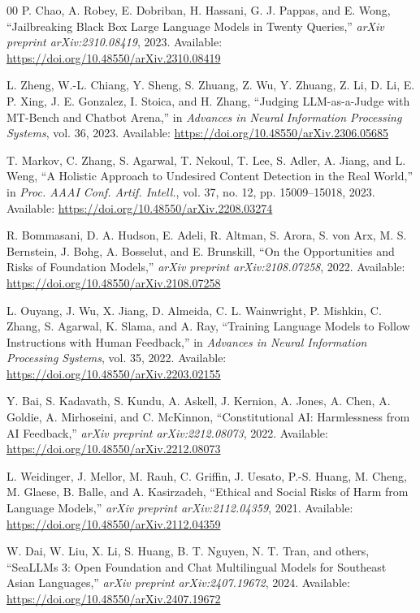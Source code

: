 \documentclass[conference]{IEEEtran}
\begin{document}
\begin{thebibliography}{00}
 P. Chao, A. Robey, E. Dobriban, H. Hassani, G. J. Pappas, and E. Wong, ``Jailbreaking Black Box Large Language Models in Twenty Queries,'' \textit{arXiv preprint arXiv:2310.08419}, 2023. Available: \url{https://doi.org/10.48550/arXiv.2310.08419}

 L. Zheng, W.-L. Chiang, Y. Sheng, S. Zhuang, Z. Wu, Y. Zhuang, Z. Li, D. Li, E. P. Xing, J. E. Gonzalez, I. Stoica, and H. Zhang, ``Judging LLM-as-a-Judge with MT-Bench and Chatbot Arena,'' in \textit{Advances in Neural Information Processing Systems}, vol. 36, 2023. Available: \url{https://doi.org/10.48550/arXiv.2306.05685}

 T. Markov, C. Zhang, S. Agarwal, T. Nekoul, T. Lee, S. Adler, A. Jiang, and L. Weng, ``A Holistic Approach to Undesired Content Detection in the Real World,'' in \textit{Proc. AAAI Conf. Artif. Intell.}, vol. 37, no. 12, pp. 15009--15018, 2023. Available: \url{https://doi.org/10.48550/arXiv.2208.03274}

 R. Bommasani, D. A. Hudson, E. Adeli, R. Altman, S. Arora, S. von Arx, M. S. Bernstein, J. Bohg, A. Bosselut, and E. Brunskill, ``On the Opportunities and Risks of Foundation Models,'' \textit{arXiv preprint arXiv:2108.07258}, 2022. Available: \url{https://doi.org/10.48550/arXiv.2108.07258}

 L. Ouyang, J. Wu, X. Jiang, D. Almeida, C. L. Wainwright, P. Mishkin, C. Zhang, S. Agarwal, K. Slama, and A. Ray, ``Training Language Models to Follow Instructions with Human Feedback,'' in \textit{Advances in Neural Information Processing Systems}, vol. 35, 2022. Available: \url{https://doi.org/10.48550/arXiv.2203.02155}

 Y. Bai, S. Kadavath, S. Kundu, A. Askell, J. Kernion, A. Jones, A. Chen, A. Goldie, A. Mirhoseini, and C. McKinnon, ``Constitutional AI: Harmlessness from AI Feedback,'' \textit{arXiv preprint arXiv:2212.08073}, 2022. Available: \url{https://doi.org/10.48550/arXiv.2212.08073}

 L. Weidinger, J. Mellor, M. Rauh, C. Griffin, J. Uesato, P.-S. Huang, M. Cheng, M. Glaese, B. Balle, and A. Kasirzadeh, ``Ethical and Social Risks of Harm from Language Models,'' \textit{arXiv preprint arXiv:2112.04359}, 2021. Available: \url{https://doi.org/10.48550/arXiv.2112.04359}

 W. Dai, W. Liu, X. Li, S. Huang, B. T. Nguyen, N. T. Tran, and others, ``SeaLLMs 3: Open Foundation and Chat Multilingual Models for Southeast Asian Languages,'' \textit{arXiv preprint arXiv:2407.19672}, 2024. Available: \url{https://doi.org/10.48550/arXiv.2407.19672}

\end{thebibliography}
\end{document}

